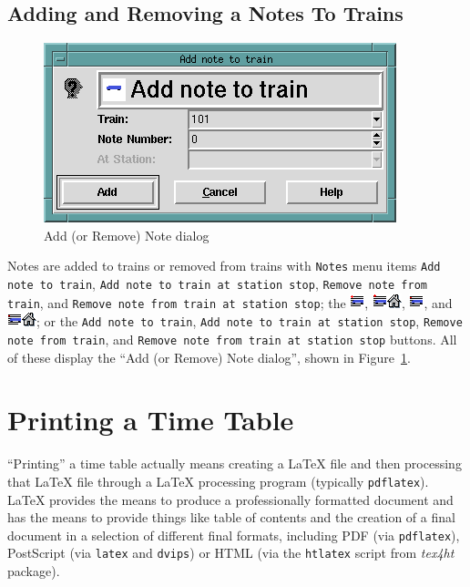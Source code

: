 \subsection{Adding and Removing a Notes To Trains}

\begin{figure}[hbpt]
\begin{centering}
\includegraphics{TTAddNote.png}
\caption{Add (or Remove) Note dialog}
\label{fig:tt:AddNote}
\end{centering}
\end{figure}
Notes are added to trains or removed from trains with \texttt{Notes} menu
items \texttt{Add note to train}, \texttt{Add note to train at station stop},
\texttt{Remove note from train}, and 
\texttt{Remove note from train at station stop}; the
\includegraphics{TTaddnotetotrain.png},
\includegraphics{TTaddnotetotrainatstation.png},
\includegraphics{TTremovenotefromtrain.png}, and
\includegraphics{TTremovenotefromtrainatstation.png}; or the  
\texttt{Add note to train}, \texttt{Add note to train at station stop}, 
\texttt{Remove note from train}, and 
\texttt{Remove note from train at station stop} buttons.  All of these
display the ``Add (or Remove) Note dialog'', shown in
Figure~\ref{fig:tt:AddNote}.

\section{Printing a Time Table}

``Printing'' a time table actually means creating a \LaTeX{} file and
then processing that \LaTeX{} file through a \LaTeX{} processing program
(typically \texttt{pdflatex}).  \LaTeX{} provides the means to produce a
professionally formatted document and has the means to provide things
like table of contents and the creation of a final document in a
selection of different final formats, including PDF (via
\texttt{pdflatex}), PostScript (via \texttt{latex} and \texttt{dvips})
or HTML (via the \texttt{htlatex} script from \textit{tex4ht} package).

